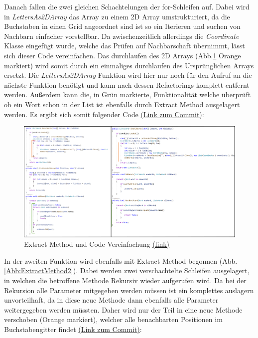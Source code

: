 Danach fallen die zwei gleichen Schachtelungen der for-Schleifen auf. Dabei wird in \textit{LettersAs2DArray} das Array zu einem 2D Array umstrukturiert, da die Buchstaben in einen Grid angeordnet sind ist so ein Iterieren und suchen von Nachbarn einfacher vorstellbar. Da zwischenzeitlich allerdings die \textit{Coordinate} Klasse eingefügt wurde, welche das Prüfen auf Nachbarschaft übernimmt, lässt sich dieser Code vereinfachen. Das durchlaufen des 2D Arrays (Abb.\ref{Abb:CodeVereinfachen} Orange markiert) wird somit durch ein einmaliges durchlaufen des Ursprünglichen Arrays ersetzt. Die \textit{LettersAs2DArray} Funktion wird hier nur noch für den Aufruf an die nächste Funktion benötigt und kann nach dessen Refactorings komplett entfernt werden. Außerdem kann die, in Grün markierte, Funktionalität welche überprüft ob ein Wort schon in der List ist ebenfalls durch Extract Method ausgelagert werden. Es ergibt sich somit folgender Code \href{https://github.com/EinToni/Wortfinder/commit/f733dabc6753529e597408cc8c76ea0a39a1ff8e}{(Link zum Commit)}:

\begin{figure}[!ht]
  \centering
  \includegraphics[width=\textwidth]{Bilder/CodeVereinfachen.PNG}
  \caption[Extract Method und Code Vereinfachung]{Extract Method und Code Vereinfachung \href{https://github.com/EinToni/WortfinderDoku/blob/main/Bilder/CodeVereinfachen.png}{(link)}}
  \label{Abb:CodeVereinfachen}
\end{figure}

In der zweiten Funktion wird ebenfalls mit Extract Method begonnen (Abb.\ref{Abb:ExtractMethod2}). Dabei werden zwei verschachtelte Schleifen ausgelagert, in welchen die betroffene Methode Rekursiv wieder aufgerufen wird. Da bei der Rekursion alle Parameter mitgegeben werden müssen ist ein komplettes auslagern unvorteilhaft, da in diese neue Methode dann ebenfalls alle Parameter weitergegeben werden müssten. Daher wird nur der Teil in eine neue Methode verschoben (Orange markiert), welcher alle benachbarten Positionen im Buchstabengitter findet \href{https://github.com/EinToni/Wortfinder/commit/23cf0b7d1165c1d17235d68f8fca35682ba233ad}{(Link zum Commit)}:

